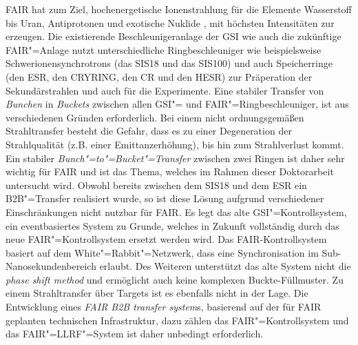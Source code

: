 FAIR hat zum Ziel, hochenergetische Ionenstrahlung für die Elemente Wasserstoff bis Uran, Antiprotonen und exotische Nuklide , mit h\"ochsten  Intensit\"aten zur erzeugen. Die existierende Beschleunigeranlage der GSI wie auch die zukünftige FAIR"=Anlage nutzt unterschiedliche Ringbeschleuniger wie beispielsweise Schwerionensynchrotrons (das SIS18 und das SIS100) und auch Speicherringe (den ESR, den CRYRING, den CR und den HESR) zur Pr\"aperation der Sekund\"arstrahlen und auch f\"ur die Experimente.  Eine stabiler Transfer von \textit{Bunchen} in \textit{Buckets} zwischen allen GSI"= und FAIR"=Ringbeschleuniger, ist aus verschiedenen Gr\"unden erforderlich. Bei einem nicht ordnungsgem\"a\ss{}en Strahltransfer besteht die Gefahr, dass es zu einer Degeneration der Strahlqualit\"at (z.B.  einer Emittanzerh\"ohung), bis hin zum Strahlverlust kommt. Ein stabiler \textit{Bunch"=to"=Bucket"=Transfer} zwischen zwei Ringen ist daher sehr wichtig f\"ur FAIR und ist das Thema, welches im Rahmen dieser Doktorarbeit untersucht wird. Obwohl bereits zwischen dem SIS18 und dem ESR ein B2B"=Transfer realisiert wurde, so ist diese L\"osung aufgrund verschiedener Einschr\"ankungen nicht nutzbar f\"ur FAIR. Es legt das alte GSI"=Kontrollsystem, ein eventbasiertes System zu Grunde, welches in Zukunft vollst\"andig durch das neue FAIR"=Kontrollsystem ersetzt werden wird. Das FAIR-Kontrollsystem basiert auf dem White"=Rabbit"=Netzwerk, dass eine Synchronisation im Sub-Nanosekundenbereich erlaubt. Des Weiteren unterst\"utzt das alte System nicht die \textit{phase shift method} und erm\"oglicht auch keine komplexen Buckte-Füllmuster. Zu einem Strahltransfer \"uber Targets ist es ebenfalls nicht in der Lage. Die Entwicklung eines \textit{FAIR B2B transfer system}s, basierend auf der f\"ur FAIR geplanten technischen Infrastruktur, dazu z\"ahlen das FAIR"=Kontrollsystem und das FAIR"=LLRF"=System ist daher unbedingt erforderlich.

